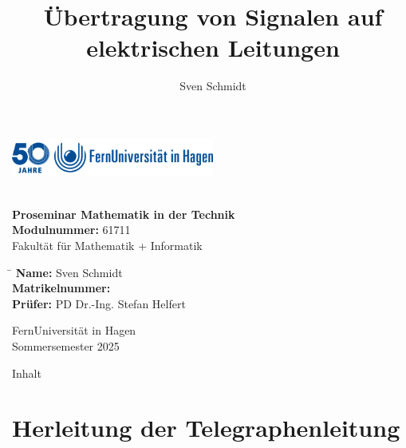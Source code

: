 \documentclass{beamer}
\title{Übertragung von Signalen auf elektrischen Leitungen}
\author{Sven Schmidt}
\begin{document}
\begin{frame}
    \centering
    \includegraphics[width=0.5\textwidth]{logo_fernuni_hagen.png}
    \vspace{0.5cm} %

    {\LARGE \textbf{\inserttitle}}\\[0.5cm]

    \textbf{Proseminar Mathematik in der Technik}\\
    \textbf{Modulnummer:} 61711\\
    Fakultät für Mathematik + Informatik\\[0.5cm]

    \begin{tabbing}
        \hspace{4cm} \= \kill
        \textbf{Name:} \> Sven Schmidt \\
        \textbf{Matrikelnummer:}  \\
        \textbf{Prüfer:} \> PD Dr.-Ing. Stefan Helfert \\
    \end{tabbing}

    \vfill

    {\large FernUniversität in Hagen}\\
    {\large Sommersemester 2025}
\end{frame}

\begin{frame}{Inhalt}
    \tableofcontents
\end{frame}

\section{Herleitung der Telegraphenleitung}
\end{document}

